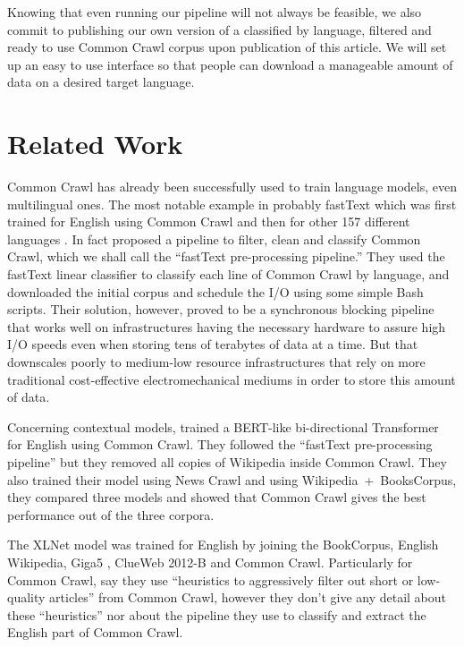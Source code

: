 Knowing that even running our pipeline will not always be feasible, we also commit to publishing our own version of a classified by language, filtered and ready to use Common Crawl corpus upon publication of this article. We will set up an easy to use interface so that people can download a manageable amount of data on a desired target language.

\section{Related Work}

Common Crawl has already been successfully used to train language models, even multilingual ones. The most notable example in probably fastText which was first trained for English using Common Crawl \citep{mikolov-etal-2018-advances} and then for other 157 different languages \citep{grave-etal-2018-learning}. In fact \citet{grave-etal-2018-learning} proposed a pipeline to filter, clean and classify Common Crawl, which we shall call the ``fastText pre-processing pipeline.'' They used the fastText linear classifier \citep{joulin-etal-2016-fasttext, joulin-etal-2017-bag} to classify each line of Common Crawl by language, and downloaded the initial corpus and schedule the I/O using some simple Bash scripts. Their solution, however, proved to be a synchronous blocking pipeline that works well on infrastructures having the necessary hardware to assure high I/O speeds even when storing tens of terabytes of data at a time. But that downscales poorly to medium-low resource infrastructures that rely on more traditional cost-effective electromechanical mediums in order to store this amount of data.

Concerning contextual models, \citet{baevski-etal-2019-cloze} trained a BERT-like bi-directional Transformer for English using Common Crawl. They followed the ``fastText pre-processing pipeline'' but they removed all copies of Wikipedia inside Common Crawl. They also trained their model using News Crawl \citep{bojar-etal-2018-findings} and using Wikipedia~+~BooksCorpus, they compared three models and showed that Common Crawl gives the best performance out of the three corpora.

The XLNet model was trained for English by joining the BookCorpus, English Wikipedia, Giga5 \citep{parker-etal-2011-english}, ClueWeb 2012-B \citep{callan-etal-2009-clueweb09} and Common Crawl. Particularly for Common Crawl, \citet{yang-etal-2019-xlnet} say they use ``heuristics to aggressively filter out short or low-quality articles'' from Common Crawl, however they don't give any detail about these ``heuristics'' nor about the pipeline they use to classify and extract the English part of Common Crawl.

